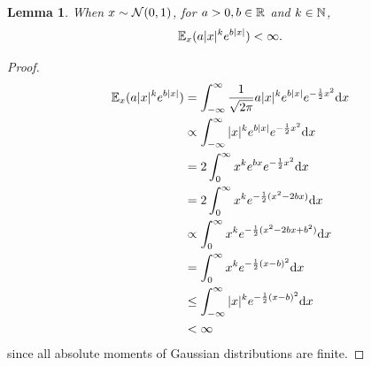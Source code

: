 \documentclass{article}
\theoremstyle{plain}
\newtheorem{lemma}[theorem]{Lemma}
\theoremstyle{definition}
\theoremstyle{remark}
\begin{document}
\begin{lemma}\label{lemma:gaussian-polynomial-exponential-is-integrable}
    When $x\sim \mathcal{N}(0, 1)$, for $a > 0, b\in \mathbb{R}$ and $k\in \mathbb{N}$,
    \begin{equation}
        \operatorname{\mathbb{E}}_x(a|x|^ke^{b|x|}) < \infty.
    \end{equation}
\end{lemma}
\begin{proof}
    \begin{equation}
        \begin{split}
            \operatorname{\mathbb{E}}_x(a|x|^ke^{b|x|})
            &= \int_{-\infty}^\infty \frac{1}{\sqrt{2\pi}} a|x|^k e^{b|x|}e^{-\frac{1}{2}x^2} \mathrm{d} x
            \\&\propto \int_{-\infty}^\infty |x|^k e^{b|x|}e^{-\frac{1}{2}x^2} \mathrm{d} x
            \\&= 2\int_{0}^\infty x^k e^{bx}e^{-\frac{1}{2}x^2} \mathrm{d} x
            \\&= 2\int_{0}^\infty x^k e^{-\frac{1}{2}(x^2 - 2bx)} \mathrm{d} x
            \\&\propto \int_{0}^\infty x^k e^{-\frac{1}{2}(x^2 - 2bx + b^2)} \mathrm{d} x
            \\&= \int_{0}^\infty x^k e^{-\frac{1}{2}(x - b)^2} \mathrm{d} x
            \\&\leq \int_{-\infty}^\infty |x|^k e^{-\frac{1}{2}(x - b)^2} \mathrm{d} x
            \\&< \infty
        \end{split}
    \end{equation}
    since all absolute moments of Gaussian distributions are finite.
\end{proof}
\end{document}
